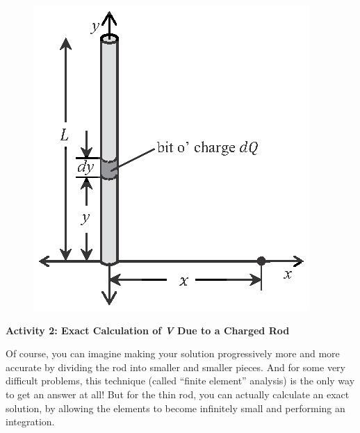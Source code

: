 \begin{figure}
\includegraphics[scale=0.9]{potential_charge_distributions/rod_integral.eps}
\end{figure}
\textbf{Activity 2: Exact Calculation of \textit{V} Due to a Charged Rod}

Of course, you can imagine making your solution progressively more and more accurate by dividing the rod into smaller and smaller pieces.  And for some very difficult problems, this technique (called ``finite element'' analysis) is the only way to get an answer at all!  But for the thin rod, you can actually calculate an exact solution, by allowing the elements to become infinitely small and performing an integration.

